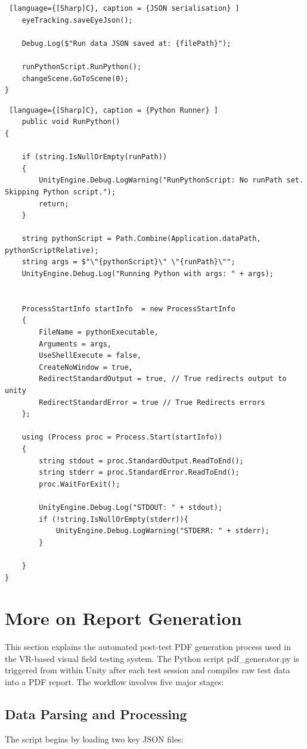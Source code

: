 \documentclass{l4proj}
\begin{document}
\begin{appendices}
\begin{lstlisting} [language={[Sharp]C}, caption = {JSON serialisation} ]
    eyeTracking.saveEyeJson();

    Debug.Log($"Run data JSON saved at: {filePath}");

    runPythonScript.RunPython();
    changeScene.GoToScene(0);
}
\end{lstlisting}

\begin{lstlisting} [language={[Sharp]C}, caption = {Python Runner} ]
    public void RunPython()
{

    if (string.IsNullOrEmpty(runPath))
    {
        UnityEngine.Debug.LogWarning("RunPythonScript: No runPath set. Skipping Python script.");
        return;
    }

    string pythonScript = Path.Combine(Application.dataPath, pythonScriptRelative);
    string args = $"\"{pythonScript}\" \"{runPath}\"";
    UnityEngine.Debug.Log("Running Python with args: " + args);


    ProcessStartInfo startInfo  = new ProcessStartInfo
    {
        FileName = pythonExecutable,
        Arguments = args,
        UseShellExecute = false,
        CreateNoWindow = true,
        RedirectStandardOutput = true, // True redirects output to unity
        RedirectStandardError = true // True Redirects errors
    };

    using (Process proc = Process.Start(startInfo))
    {
        string stdout = proc.StandardOutput.ReadToEnd();
        string stderr = proc.StandardError.ReadToEnd();
        proc.WaitForExit();

        UnityEngine.Debug.Log("STDOUT: " + stdout);
        if (!string.IsNullOrEmpty(stderr)){
            UnityEngine.Debug.LogWarning("STDERR: " + stderr);
        }
            
    }
}
\end{lstlisting}
\newpage
\section{More on Report Generation}
\label{report generation}
This section explains the automated post-test PDF generation process used in the VR-based visual field testing system. The Python script pdf\_generator.py is triggered from within Unity after each test session and compiles raw test data into a PDF report. The workflow involves five major stages:

\subsection{Data Parsing and Processing}
The script begins by loading two key JSON files:


\end{appendices}
\end{document}
